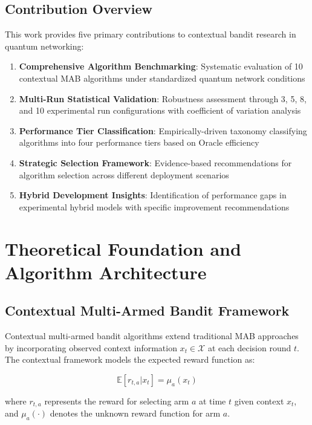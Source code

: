 \documentclass[12pt,a4paper]{article}
\begin{document}
\subsection{Contribution Overview}

This work provides five primary contributions to contextual bandit research in quantum networking:

\begin{enumerate}
\item \textbf{Comprehensive Algorithm Benchmarking}: Systematic evaluation of 10 contextual MAB algorithms under standardized quantum network conditions
\item \textbf{Multi-Run Statistical Validation}: Robustness assessment through 3, 5, 8, and 10 experimental run configurations with coefficient of variation analysis
\item \textbf{Performance Tier Classification}: Empirically-driven taxonomy classifying algorithms into four performance tiers based on Oracle efficiency
\item \textbf{Strategic Selection Framework}: Evidence-based recommendations for algorithm selection across different deployment scenarios
\item \textbf{Hybrid Development Insights}: Identification of performance gaps in experimental hybrid models with specific improvement recommendations
\end{enumerate}

\section{Theoretical Foundation and Algorithm Architecture}

\subsection{Contextual Multi-Armed Bandit Framework}

Contextual multi-armed bandit algorithms extend traditional MAB approaches by incorporating observed context information $x_t \in \mathcal{X}$ at each decision round $t$. The contextual framework models the expected reward function as:

\begin{equation}
\mathbb{E}[r_{t,a} | x_t] = \mu_a(x_t)
\end{equation}

where $r_{t,a}$ represents the reward for selecting arm $a$ at time $t$ given context $x_t$, and $\mu_a(\cdot)$ denotes the unknown reward function for arm $a$.
\end{document}
